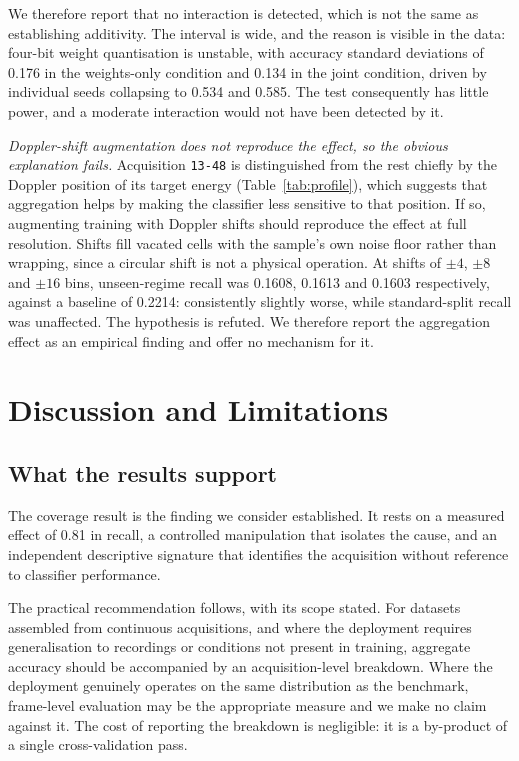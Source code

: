 \documentclass[conference]{IEEEtran}
\begin{document}
We therefore report that no interaction is detected, which is not the same as
establishing additivity. The interval is wide, and the reason is visible in
the data: four-bit weight quantisation is unstable, with accuracy standard
deviations of 0.176 in the weights-only condition and 0.134 in the joint
condition, driven by individual seeds collapsing to 0.534 and 0.585. The test
consequently has little power, and a moderate interaction would not have been
detected by it.

\emph{Doppler-shift augmentation does not reproduce the effect, so the
obvious explanation fails.} Acquisition \texttt{13-48} is distinguished from
the rest chiefly by the Doppler position of its target energy
(Table~\ref{tab:profile}), which suggests that aggregation helps by making
the classifier less sensitive to that position. If so, augmenting
training with Doppler shifts should reproduce the effect at full resolution.
Shifts fill vacated cells with the sample's own noise floor rather than
wrapping, since a circular shift is not a physical operation. At shifts of
$\pm4$, $\pm8$ and $\pm16$ bins, unseen-regime recall was 0.1608, 0.1613 and
0.1603 respectively, against a baseline of 0.2214: consistently slightly
worse, while standard-split recall was unaffected. The hypothesis is
refuted. We therefore report the aggregation effect as an empirical finding
and offer no mechanism for it.

\section{Discussion and Limitations}

\subsection{What the results support}

The coverage result is the finding we consider established. It rests on a
measured effect of 0.81 in recall, a controlled manipulation that isolates
the cause, and an independent descriptive signature that identifies the
acquisition without reference to classifier performance.

The practical recommendation follows, with its scope stated. For datasets
assembled from continuous acquisitions, and where the deployment requires
generalisation to recordings or conditions not present in training, aggregate
accuracy should be accompanied by an acquisition-level breakdown. Where the
deployment genuinely operates on the same distribution as the benchmark,
frame-level evaluation may be the appropriate measure and we make no claim
against it. The cost of reporting the breakdown is negligible: it is a
by-product of a single cross-validation pass.
\end{document}
